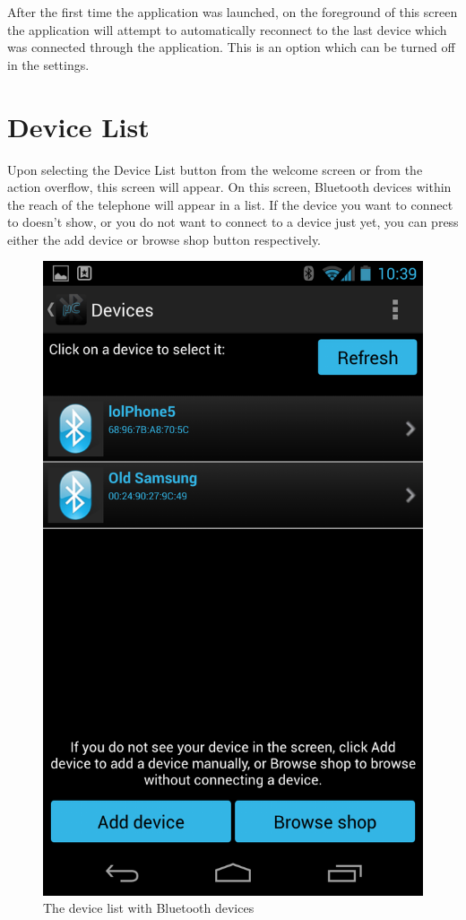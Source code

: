 After the first time the application was launched, on the foreground of this screen the application will attempt to automatically reconnect to the last device which was connected through the application. This is an option which can be turned off in the settings. 

\chapter{Device List}
Upon selecting the Device List button from the welcome screen or from the action overflow, this screen will appear. On this screen, Bluetooth devices within the reach of the telephone will appear in a list. If the device you want to connect to doesn't show, or you do not want to connect to a device just yet, you can press either the add device or browse shop button respectively.\\
\newline
\begin{figure}[H]
	\centering
	\includegraphics[scale = 0.3]{images/Screenshots/device_list.png}
	\caption{The device list with Bluetooth devices}
\end{figure}
